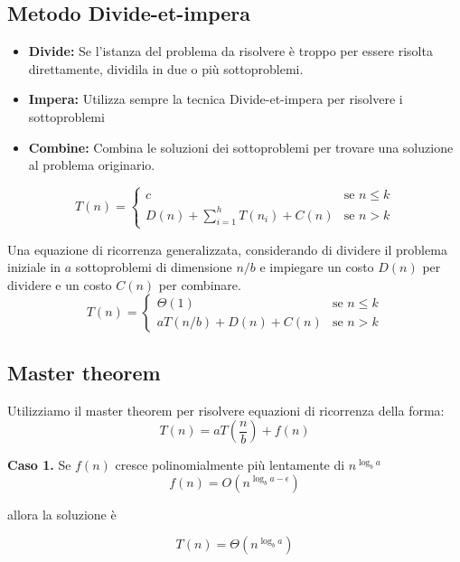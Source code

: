 \documentclass{article}
\begin{document}
\subsection{Metodo Divide-et-impera}

\begin{itemize}
    \item \textbf{Divide: } Se l'istanza del problema da risolvere è troppo  per essere risolta direttamente, dividila in due o più sottoproblemi.
    \item \textbf{Impera: } Utilizza sempre la tecnica Divide-et-impera per risolvere i sottoproblemi
    \item \textbf{Combine: } Combina le soluzioni dei sottoproblemi per trovare una soluzione al problema originario.
\end{itemize}

\begin{equation*}
    T(n) =
    \begin{cases}
        c & \text{se } n \leq k  \\
        D(n) + \sum_{i = 1}^h T(n_i) + C(n) & \text{se }n > k
    \end{cases}
\end{equation*}

Una equazione di ricorrenza generalizzata, considerando di dividere il problema iniziale in \(a\) sottoproblemi di dimensione \(n/b\) e impiegare un costo \(D(n)\) per dividere e un costo \(C(n)\) per combinare.
\begin{equation*}
    T(n) =
    \begin{cases}
        \Theta(1) & \text{se } n \leq k  \\
        aT(n/b) + D(n) + C(n) & \text{se }n > k
    \end{cases}
\end{equation*}

\subsection{Master theorem}
Utilizziamo il master theorem per risolvere equazioni di ricorrenza della forma:
\[T(n) = aT\left(\frac{n}{b}\right) + f(n)\]

\vspace{1cm}

\textbf{Caso 1.}
Se \(f(n)\) cresce polinomialmente più lentamente di \(n^{\log_b a}\)
\[f(n) = O\left(n^{\log_b a - \epsilon}\right)\]
\begin{center}allora la soluzione è\end{center}
\[T(n) = \Theta\left(n^{\log_b a}\right)\]
\end{document}
